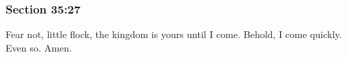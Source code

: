 	\subsubsection{Section 35:27} %
		\label{DC35-27}

		Fear not, little flock, the kingdom is yours until I come.  Behold, I come quickly.  Even so.  Amen.


